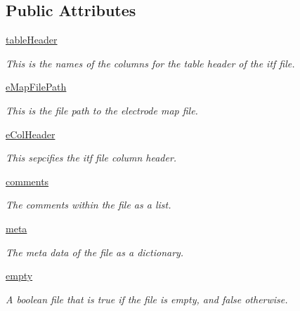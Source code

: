\subsection*{Public Attributes}
\begin{DoxyCompactItemize}
\item 
\hyperlink{class_chassis_8git_1_1itf_parser_1_1itf_parser_aabe657c777e68a49fc38cfd1fbd39858}{table\-Header}
\begin{DoxyCompactList}\small\item\em This is the names of the columns for the table header of the itf file. \end{DoxyCompactList}\item 
\hyperlink{class_chassis_8git_1_1itf_parser_1_1itf_parser_a30e8967fe68b381f94cf97c8f9a26475}{e\-Map\-File\-Path}
\begin{DoxyCompactList}\small\item\em This is the file path to the electrode map file. \end{DoxyCompactList}\item 
\hyperlink{class_chassis_8git_1_1itf_parser_1_1itf_parser_a6b33c67f09f9e00b2123608603319604}{e\-Col\-Header}
\begin{DoxyCompactList}\small\item\em This sepcifies the itf file column header. \end{DoxyCompactList}\item 
\hyperlink{class_chassis_8git_1_1itf_parser_1_1itf_parser_aa26d0241c83bf5bb06755dbf400c48b0}{comments}
\begin{DoxyCompactList}\small\item\em The comments within the file as a list. \end{DoxyCompactList}\item 
\hyperlink{class_chassis_8git_1_1itf_parser_1_1itf_parser_aab9e99f0ba1172bdc0a0c2ff59a6ef4e}{meta}
\begin{DoxyCompactList}\small\item\em The meta data of the file as a dictionary. \end{DoxyCompactList}\item 
\hyperlink{class_chassis_8git_1_1itf_parser_1_1itf_parser_a75bd647d304a98ce719934c5696ac49b}{empty}
\begin{DoxyCompactList}\small\item\em A boolean file that is true if the file is empty, and false otherwise. \end{DoxyCompactList}\end{DoxyCompactItemize}


